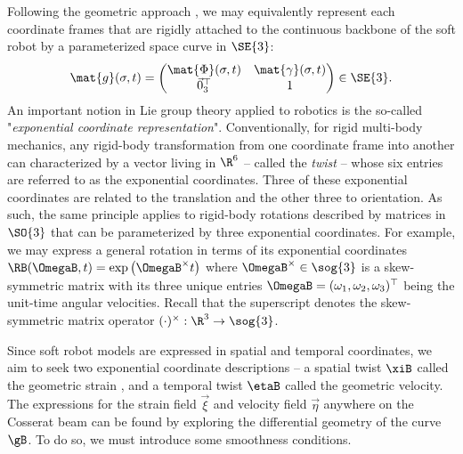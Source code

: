 Following the geometric approach \cite{Simo1986,Boyer2010,Boyer2021,Renda2018,Renda2020}, we may equivalently represent each coordinate frames that are rigidly attached to the continuous backbone of the soft robot by a parameterized space curve in $\SE{3}$:
%
\begin{equation}
\mat{g}(\sigma,t) = \begin{pmatrix} \mat{\Phi}(\sigma,t) & \mat{\gamma}(\sigma,t) \\ \vec{0}_3^\top & 1 \end{pmatrix} \in \SE{3}.
\label{eq:C3:backbone}
\end{equation}
%
An important notion in Lie group theory applied to robotics is the so-called "\textit{exponential coordinate representation}". Conventionally, for rigid multi-body mechanics, any rigid-body transformation from one coordinate frame into another can characterized by a vector living in $\R^6$ -- called the \textit{twist} -- whose six entries are referred to as the exponential coordinates. Three of these exponential coordinates are related to the translation and the other three to orientation. As such, the same principle applies to rigid-body rotations described by matrices in $\SO{3}$ that can be parameterized by three exponential coordinates. For example, we may express a general rotation in terms of its exponential coordinates $\RB(\OmegaB,t) = \exp\left( {\OmegaB}^\times t \right)$ where $\OmegaB^\times \in \sog{3}$ is a skew-symmetric matrix with its three unique entries $\OmegaB = (\omega_1,\omega_2,\omega_3)^\top$ being the unit-time angular velocities. Recall that the superscript denotes the skew-symmetric matrix operator $(\cdot)^\times:\R^3 \to \sog{3}$. %

Since soft robot models are expressed in spatial and temporal coordinates, we aim to seek two exponential coordinate descriptions -- a spatial twist $\xiB$ called the geometric strain , and a temporal twist $\etaB$ called the geometric velocity. The expressions for the strain field $\vec{\xi}$ and velocity field $\vec{\eta}$ anywhere on the Cosserat beam can be found by exploring the differential geometry of the curve $\gB$. To do so, we must introduce some smoothness conditions.

